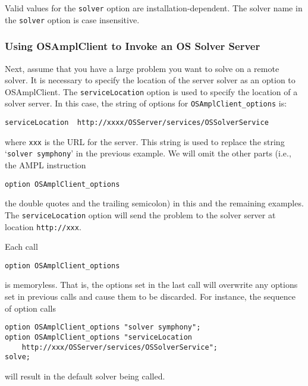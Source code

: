 Valid values for the {\tt solver} option are installation-dependent.
The solver name in the {\tt solver} option is case insensitive.  


\subsubsection{Using OSAmplClient to Invoke an OS Solver Server}\label{section:remoteampl}

Next, assume that you have a large problem you want to solve on a remote solver. It is necessary 
to specify the location of the server solver as an option to OSAmplClient. 
The {\tt serviceLocation} option is used to specify the location of a solver server. 
In this case, the string of options for {\tt OSAmplClient\_options} is:

\begin{verbatim}
serviceLocation  http://xxxx/OSServer/services/OSSolverService
\end{verbatim}
where {\tt xxx} is the URL for the server.  This string is used to replace the string `{\tt solver symphony}' in the previous example. 
We will omit the other parts (i.e., the AMPL instruction
\begin{verbatim}
option OSAmplClient_options
\end{verbatim}
the double quotes and the trailing semicolon) in this and the remaining examples.  The {\tt serviceLocation} option will send the problem to the solver server at location {\tt http://xxx}.   


\medskip


Each call 
\begin{verbatim}
option OSAmplClient_options
\end{verbatim}
is memoryless. That is, the options set in the last call will overwrite any options set in previous calls
and cause them to be discarded.  For instance, the sequence of option calls
\begin{verbatim}
option OSAmplClient_options "solver symphony";
option OSAmplClient_options "serviceLocation  
    http://xxx/OSServer/services/OSSolverService";
solve;
\end{verbatim}
will result in the default solver being called. 

\medskip

